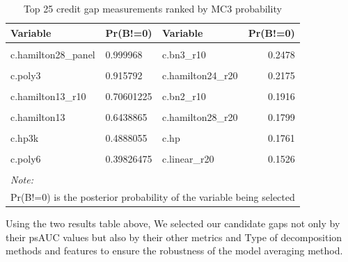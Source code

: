 \documentclass[
  12pt,
]{article}
\begin{document}
\tiny
\begin{table}[H]

\caption{\label{tab:varselectMC3}Top 25 credit gap measurements ranked by MC3 probability}
\centering
\begin{tabular}[t]{lllr}
\toprule
Variable & Pr(B!=0) & Variable & Pr(B!=0)\\
\midrule
\cellcolor{gray!6}{Intercept} & \cellcolor{gray!6}{1} & \cellcolor{gray!6}{c.bn2} & \cellcolor{gray!6}{0.3721}\\
c.hamilton28\_panel & 0.999968 & c.bn3\_r10 & 0.2478\\
\cellcolor{gray!6}{c.bn7\_r15} & \cellcolor{gray!6}{0.93097125} & \cellcolor{gray!6}{c.hp400k} & \cellcolor{gray!6}{0.2309}\\
c.poly3 & 0.915792 & c.hamilton24\_r20 & 0.2175\\
\cellcolor{gray!6}{c.hamilton13\_panel} & \cellcolor{gray!6}{0.733247} & \cellcolor{gray!6}{c.hamilton13\_r20} & \cellcolor{gray!6}{0.1958}\\
\addlinespace
c.hamilton13\_r10 & 0.70601225 & c.bn2\_r10 & 0.1916\\
\cellcolor{gray!6}{c.hamilton28} & \cellcolor{gray!6}{0.65141375} & \cellcolor{gray!6}{c.stm} & \cellcolor{gray!6}{0.1894}\\
c.hamilton13 & 0.6438865 & c.hamilton28\_r20 & 0.1799\\
\cellcolor{gray!6}{c.bn3\_r15} & \cellcolor{gray!6}{0.514728} & \cellcolor{gray!6}{c.hp\_r20} & \cellcolor{gray!6}{0.1794}\\
c.hp3k & 0.4888055 & c.hp & 0.1761\\
\addlinespace
\cellcolor{gray!6}{c.hp3k\_r20} & \cellcolor{gray!6}{0.4887615} & \cellcolor{gray!6}{c.bn8\_r20} & \cellcolor{gray!6}{0.1561}\\
c.poly6 & 0.39826475 & c.linear\_r20 & 0.1526\\
\cellcolor{gray!6}{} & \cellcolor{gray!6}{} & \cellcolor{gray!6}{c.hp221k} & \cellcolor{gray!6}{0.1440}\\
\bottomrule
\multicolumn{4}{l}{\rule{0pt}{1em}\textit{Note: }}\\
\multicolumn{4}{l}{\rule{0pt}{1em}Pr(B!=0) is the posterior probability of the variable being selected}\\
\end{tabular}
\end{table}
\normalsize

Using the two results table above, We selected our candidate gaps not only by their psAUC values but also by their other metrics and Type of decomposition methods and features to ensure the robustness of the model averaging method.
\end{document}
